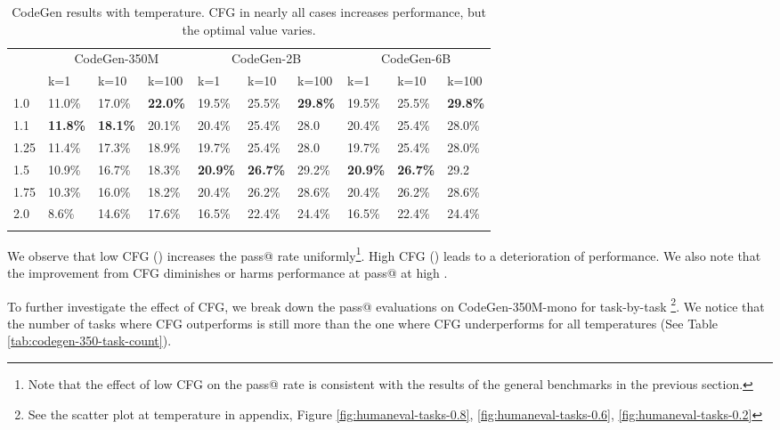 \documentclass{article}
\begin{document}
\begin{table}[t]
    \centering
    \begin{tabular}{llllllllll}
        \toprule
         & \multicolumn{3}{c}{CodeGen-350M} & \multicolumn{3}{c}{CodeGen-2B} & \multicolumn{3}{c}{CodeGen-6B} \\
         \cmidrule(r){2-4} \cmidrule(r){5-7} \cmidrule(r){8-10}
         & k=1 & k=10 & k=100 & k=1 & k=10 & k=100 & k=1 & k=10 & k=100 \\
        \midrule
        1.0 & 11.0\% & 17.0\% & \textbf{22.0\%} & 19.5\% & 25.5\% & \textbf{29.8\%} & 19.5\% & 25.5\% & \textbf{29.8\%} \\
        1.1 & \textbf{11.8\%} & \textbf{18.1\%} & 20.1\% & 20.4\% & 25.4\% & 28.0 & 20.4\% & 25.4\% & 28.0\% \\
        1.25 & 11.4\% & 17.3\% & 18.9\% & 19.7\% & 25.4\% & 28.0 & 19.7\% & 25.4\% & 28.0\% \\
        1.5 & 10.9\% & 16.7\% & 18.3\% & \textbf{20.9\%} & \textbf{26.7\%} & 29.2\% & \textbf{20.9\%} & \textbf{26.7\%} & 29.2\\
        1.75 & 10.3\% & 16.0\% & 18.2\% & 20.4\% & 26.2\% & 28.6\% & 20.4\% & 26.2\% & 28.6\% \\
        2.0 & 8.6\% & 14.6\% & 17.6\% & 16.5\% & 22.4\% & 24.4\% & 16.5\% & 22.4\% & 24.4\% \\
        \bottomrule\\
    \end{tabular}
    \caption{CodeGen results with temperature. CFG in nearly all cases increases performance, but the optimal  value varies.}
    \label{tab:codegen}
\end{table}

We observe that low CFG () increases the pass@ rate uniformly\footnote{Note that the effect of low CFG on the pass@ rate is consistent with the results of the general benchmarks in the previous section.}. High CFG () leads to a deterioration of performance. We also note that the improvement from CFG diminishes or harms performance at pass@ at high .

To further investigate the effect of CFG, we break down the pass@ evaluations on CodeGen-350M-mono for  task-by-task \footnote{See the scatter plot at temperature  in appendix, Figure \ref{fig:humaneval-tasks-0.8}, \ref{fig:humaneval-tasks-0.6}, \ref{fig:humaneval-tasks-0.2}}. We notice that the number of tasks where CFG outperforms is still more than the one where CFG underperforms for all temperatures  (See Table \ref{tab:codegen-350-task-count}). 
\end{document}
